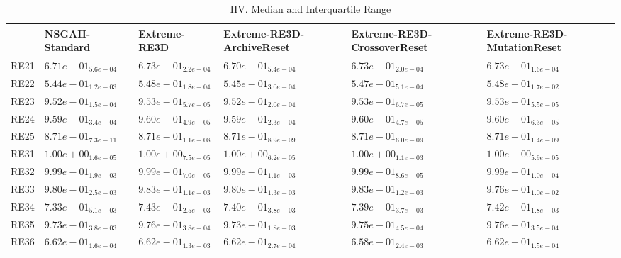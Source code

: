 \documentclass{article}
\begin{document}
\begin{table}
\caption{HV. Median and Interquartile Range}
\label{table: HV}
\centering
\begin{scriptsize}
\begin{tabular}{llllll}
\hline & NSGAII-Standard & Extreme-RE3D & Extreme-RE3D-ArchiveReset & Extreme-RE3D-CrossoverReset &  Extreme-RE3D-MutationReset\\
\hline 
RE21 & $  6.71e-01_{ 5.6e-04}$ & $  6.73e-01_{ 2.2e-04}$ & $  6.70e-01_{ 5.4e-04}$ & \cellcolor{gray25}$  6.73e-01_{ 2.0e-04}$ & \cellcolor{gray95}$  6.73e-01_{ 1.6e-04}$ \\
RE22 & $  5.44e-01_{ 1.2e-03}$ & \cellcolor{gray25}$  5.48e-01_{ 1.8e-04}$ & $  5.45e-01_{ 3.0e-04}$ & $  5.47e-01_{ 5.1e-04}$ & \cellcolor{gray95}$  5.48e-01_{ 1.7e-02}$ \\
RE23 & $  9.52e-01_{ 1.5e-04}$ & $  9.53e-01_{ 5.7e-05}$ & $  9.52e-01_{ 2.0e-04}$ & \cellcolor{gray95}$  9.53e-01_{ 6.7e-05}$ & \cellcolor{gray25}$  9.53e-01_{ 5.5e-05}$ \\
RE24 & $  9.59e-01_{ 3.4e-04}$ & \cellcolor{gray25}$  9.60e-01_{ 4.9e-05}$ & $  9.59e-01_{ 2.3e-04}$ & $  9.60e-01_{ 4.7e-05}$ & \cellcolor{gray95}$  9.60e-01_{ 6.3e-05}$ \\
RE25 & \cellcolor{gray95}$  8.71e-01_{ 7.3e-11}$ & $  8.71e-01_{ 1.1e-08}$ & $  8.71e-01_{ 8.9e-09}$ & $  8.71e-01_{ 6.0e-09}$ & \cellcolor{gray25}$  8.71e-01_{ 1.4e-09}$ \\
RE31 & \cellcolor{gray95}$  1.00e+00_{ 1.6e-05}$ & $  1.00e+00_{ 7.5e-05}$ & $  1.00e+00_{ 6.2e-05}$ & $  1.00e+00_{ 1.1e-03}$ & \cellcolor{gray25}$  1.00e+00_{ 5.9e-05}$ \\
RE32 & $  9.99e-01_{ 1.9e-03}$ & \cellcolor{gray25}$  9.99e-01_{ 7.0e-05}$ & $  9.99e-01_{ 1.1e-03}$ & $  9.99e-01_{ 8.6e-05}$ & \cellcolor{gray95}$  9.99e-01_{ 1.0e-04}$ \\
RE33 & $  9.80e-01_{ 2.5e-03}$ & \cellcolor{gray95}$  9.83e-01_{ 1.1e-03}$ & $  9.80e-01_{ 1.3e-03}$ & \cellcolor{gray25}$  9.83e-01_{ 1.2e-03}$ & $  9.76e-01_{ 1.0e-02}$ \\
RE34 & $  7.33e-01_{ 5.1e-03}$ & \cellcolor{gray95}$  7.43e-01_{ 2.5e-03}$ & $  7.40e-01_{ 3.8e-03}$ & $  7.39e-01_{ 3.7e-03}$ & \cellcolor{gray25}$  7.42e-01_{ 1.8e-03}$ \\
RE35 & $  9.73e-01_{ 3.8e-03}$ & \cellcolor{gray25}$  9.76e-01_{ 3.8e-04}$ & $  9.73e-01_{ 1.8e-03}$ & $  9.75e-01_{ 4.5e-04}$ & \cellcolor{gray95}$  9.76e-01_{ 3.5e-04}$ \\
RE36 & \cellcolor{gray25}$  6.62e-01_{ 1.6e-04}$ & $  6.62e-01_{ 1.3e-03}$ & $  6.62e-01_{ 2.7e-04}$ & $  6.58e-01_{ 2.4e-03}$ & \cellcolor{gray95}$  6.62e-01_{ 1.5e-04}$ \\

\end{tabular}
\end{scriptsize}
\end{table}
\end{document}
